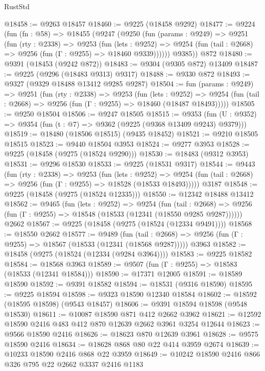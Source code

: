 \begin{lexlean}{RustStd}
\begin{coremodule}
@18458 := @9263 @18457
@18460 := @9225 (@18458 @9292)
@18477 := @9224
    (fun (fn : @58) =>
    @18455
      (@9247
        (@9250
          (fun (params : @9249) =>
          @9251
            (fun (rty : @2338) =>
            @9253
              (fun (lets : @9252) =>
              @9254 (fun (tail : @2668) => @9256 (fun (Γ : @9255) => @18460 @9339))))))
        @9385))
    @872
@18480 := @9391 (@18453 (@9242 @872))
@18483 := @9304 (@9305 @872) @13409
@18487 := @9225 (@9296 (@18483 @9313) @9317)
@18488 := @9330 @872
@18493 := @9327 (@9329 @18488 @13412 @9285 @9287)
@18504 := fun (params : @9249) =>
  @9251
    (fun (rty : @2338) =>
    @9253
      (fun (lets : @9252) =>
      @9254 (fun (tail : @2668) => @9256 (fun (Γ : @9255) => @18460 (@18487 @18493)))))
@18505 := @9250 @18504
@18506 := @9247 @18505
@18515 := @9353
    (fun (U : @9352) => @9354 (fun (t : @7) => @9362 (@9225 (@9368 @13409 @9243) @9379)))
@18519 := @18480 (@18506 @18515) (@9435 @18452)
@18521 := @9210 @18505 @18515
@18523 := @9440 @18504 @3953
@18524 := @9277 @3953
@18528 := @9225 (@18458 (@9275 (@18524 @9290)))
@18530 := @18483 (@9312 @3953)
@18531 := @9296 @18530
@18533 := @9225 (@18531 @9317)
@18544 := @9443
    (fun (rty : @2338) =>
    @9253
      (fun (lets : @9252) =>
      @9254 (fun (tail : @2668) => @9256 (fun (Γ : @9255) => @18528 (@18533 @18493)))))
    @3187
@18548 := @9225 (@18458 (@9275 (@18524 @12335)))
@18550 := @12342 @18488 @13412
@18562 := @9465
    (fun (lets : @9252) =>
    @9254
      (fun (tail : @2668) =>
      @9256 (fun (Γ : @9255) => @18548 (@18533 (@12341 (@18550 @9285 @9287))))))
    @2662
@18567 := @9225 (@18458 (@9275 (@18524 (@12334 @9491))))
@18568 := @18550 @2662
@18577 := @9489
    (fun (tail : @2668) => @9256 (fun (Γ : @9255) => @18567 (@18533 (@12341 (@18568 @9287)))))
    @3963
@18582 := @18458 (@9275 (@18524 (@12334 (@9284 @3964))))
@18583 := @9225 @18582
@18584 := @18568 @3963
@18589 := @9507 (fun (Γ : @9255) => @18583 (@18533 (@12341 @18584)))
@18590 := @17371 @12005
@18591 := @18589 @18590
@18592 := @9391 @18582
@18594 := @18531 (@9316 @18590)
@18595 := @9225 @18594
@18598 := @9323 @18590 @12340 @18584
@18602 := @18592 (@18595 @18598) (@9543 @18457)
@18606 := @9391 @18594 @18598 (@9548 @18530)
@18611 := @10087 @18590 @871 @412 @2662 @3962
@18621 := @12592 @18590 @2416 @483 @412 @870 @12639 @2662 @3961 @3254 @12644
@18623 := @9566 @18590 @2416
@18626 := @18623 @870 @12639 @3961
@18628 := @9575 @18590 @2416
@18634 := @18628 @868 @80 @22 @414 @3959 @2674
@18639 := @10233 @18590 @2416 @868 @22 @3959
@18649 := @10242 @18590 @2416 @866 @326 @795 @22 @2662 @3337 @2416 @1183

\end{coremodule}
\end{lexlean}
